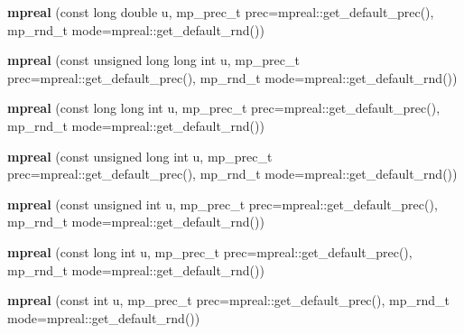 \begin{DoxyCompactItemize}
\item 
\mbox{\label{classmpfr_1_1mpreal_aa32eb4b480368db0b153cee6a275edcd}} 
{\bfseries mpreal} (const long double u, mp\+\_\+prec\+\_\+t prec=mpreal\+::get\+\_\+default\+\_\+prec(), mp\+\_\+rnd\+\_\+t mode=mpreal\+::get\+\_\+default\+\_\+rnd())
\item 
\mbox{\label{classmpfr_1_1mpreal_abf092f1b26631d929a3bc8bc9366d5b7}} 
{\bfseries mpreal} (const unsigned long long int u, mp\+\_\+prec\+\_\+t prec=mpreal\+::get\+\_\+default\+\_\+prec(), mp\+\_\+rnd\+\_\+t mode=mpreal\+::get\+\_\+default\+\_\+rnd())
\item 
\mbox{\label{classmpfr_1_1mpreal_afd97c92d01079a2fcc5965ae8c924c98}} 
{\bfseries mpreal} (const long long int u, mp\+\_\+prec\+\_\+t prec=mpreal\+::get\+\_\+default\+\_\+prec(), mp\+\_\+rnd\+\_\+t mode=mpreal\+::get\+\_\+default\+\_\+rnd())
\item 
\mbox{\label{classmpfr_1_1mpreal_afe90ffeaa0b8deb8e96aa6df1e55b23d}} 
{\bfseries mpreal} (const unsigned long int u, mp\+\_\+prec\+\_\+t prec=mpreal\+::get\+\_\+default\+\_\+prec(), mp\+\_\+rnd\+\_\+t mode=mpreal\+::get\+\_\+default\+\_\+rnd())
\item 
\mbox{\label{classmpfr_1_1mpreal_a0cb61a8a4e5266db74df1ca5f64c1743}} 
{\bfseries mpreal} (const unsigned int u, mp\+\_\+prec\+\_\+t prec=mpreal\+::get\+\_\+default\+\_\+prec(), mp\+\_\+rnd\+\_\+t mode=mpreal\+::get\+\_\+default\+\_\+rnd())
\item 
\mbox{\label{classmpfr_1_1mpreal_ab3444b6afda61cd871dd426eb078ec19}} 
{\bfseries mpreal} (const long int u, mp\+\_\+prec\+\_\+t prec=mpreal\+::get\+\_\+default\+\_\+prec(), mp\+\_\+rnd\+\_\+t mode=mpreal\+::get\+\_\+default\+\_\+rnd())
\item 
\mbox{\label{classmpfr_1_1mpreal_a57a936769bf2657134b73f041b771e6e}} 
{\bfseries mpreal} (const int u, mp\+\_\+prec\+\_\+t prec=mpreal\+::get\+\_\+default\+\_\+prec(), mp\+\_\+rnd\+\_\+t mode=mpreal\+::get\+\_\+default\+\_\+rnd())
\item 
\mbox{\label{classmpfr_1_1mpreal_afe16d889eded45f1fec612bb9671cc06}} 

\end{DoxyCompactItemize}
